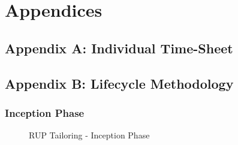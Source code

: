 \documentclass[12pt]{article} %
\begin{document}
	\newpage
	
	\section{Appendices}
	
	\subsection{Appendix A: Individual Time-Sheet}
	
		\begin{figure}[H] %
			\label{fig:speciation}
		\end{figure}
	
	\newpage
		
	\subsection{Appendix B: Lifecycle Methodology}
	
	\subsubsection{Inception Phase}
	
			\begin{figure}[H] %
				\caption{RUP Tailoring - Inception Phase}
				\label{fig:speciation}
			\end{figure}
			
\end{document}
